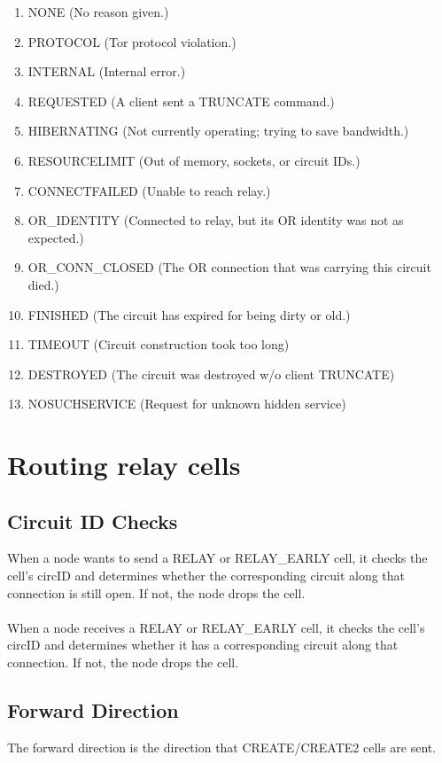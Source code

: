 \begin{enumerate}
    \item NONE (No reason given.)
    \item PROTOCOL (Tor protocol violation.)
    \item INTERNAL (Internal error.)
    \item REQUESTED (A client sent a TRUNCATE command.)
    \item HIBERNATING (Not currently operating; trying to save bandwidth.)
    \item RESOURCELIMIT (Out of memory, sockets, or circuit IDs.)
    \item CONNECTFAILED (Unable to reach relay.)
    \item OR\_IDENTITY (Connected to relay, but its OR identity was not
    as expected.)
    \item OR\_CONN\_CLOSED (The OR connection that was carrying this circuit
    died.)
    \item FINISHED (The circuit has expired for being dirty or old.)
    \item TIMEOUT (Circuit construction took too long)
    \item DESTROYED (The circuit was destroyed w/o client TRUNCATE)
    \item NOSUCHSERVICE (Request for unknown hidden service)
\end{enumerate}

\section{Routing relay cells}

\subsection{Circuit ID Checks}

When a node wants to send a RELAY or RELAY\_EARLY cell, it checks the cell's
circID and determines whether the corresponding circuit along that
connection is still open. If not, the node drops the cell.

\paragraph{}
When a node receives a RELAY or RELAY\_EARLY cell, it checks the cell's
circID and determines whether it has a corresponding circuit along
that connection. If not, the node drops the cell.

\subsection{Forward Direction}
The forward direction is the direction that CREATE/CREATE2 cells
are sent.

